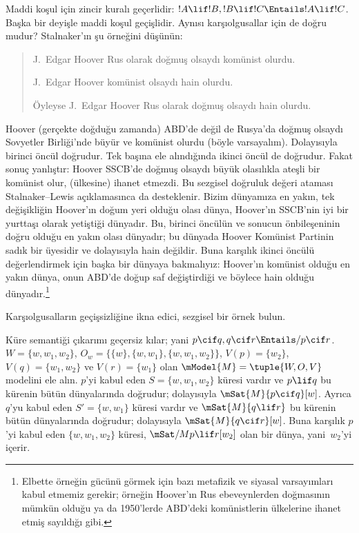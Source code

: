 \documentclass[../../../include/open-logic-section]{subfiles}
\begin{document}


Maddi koşul için zincir kuralı geçerlidir:
$!A\lif !B,!B\lif !C\Entails !A\lif !C$. Başka bir deyişle maddi koşul
geçişlidir. Aynısı karşıolgusallar için de doğru mudur? Stalnaker'ın şu
örneğini düşünün:
\begin{quote}
  J.~Edgar Hoover Rus olarak doğmuş olsaydı komünist olurdu.

  J.~Edgar Hoover komünist olsaydı hain olurdu.

  Öyleyse J.~Edgar Hoover Rus olarak doğmuş olsaydı hain olurdu.
\end{quote}
Hoover (gerçekte doğduğu zamanda) ABD'de değil de Rusya'da doğmuş olsaydı
Sovyetler Birliği'nde büyür ve komünist olurdu (böyle varsayalım). Dolayısıyla
birinci öncül doğrudur. Tek başına ele alındığında ikinci öncül de doğrudur.
Fakat sonuç yanlıştır: Hoover SSCB'de doğmuş olsaydı büyük olasılıkla ateşli
bir komünist olur, (ülkesine) ihanet etmezdi. Bu sezgisel doğruluk değeri
ataması Stalnaker--Lewis açıklamasınca da desteklenir. Bizim dünyamıza en
yakın, tek değişikliğin Hoover'ın doğum yeri olduğu olası dünya, Hoover'ın
SSCB'nin iyi bir yurttaşı olarak yetiştiği dünyadır. Bu, birinci öncülün ve
sonucun önbileşeninin doğru olduğu en yakın olası dünyadır; bu dünyada Hoover
Komünist Partinin sadık bir üyesidir ve dolayısıyla hain değildir. Buna
karşılık ikinci öncülü değerlendirmek için başka bir dünyaya bakmalıyız:
Hoover'ın komünist olduğu en yakın dünya, onun ABD'de doğup saf değiştirdiği
ve böylece hain olduğu dünyadır.\footnote{Elbette örneğin gücünü görmek için
  bazı metafizik ve siyasal varsayımları kabul etmemiz gerekir; örneğin
  Hoover'ın Rus ebeveynlerden doğmasının mümkün olduğu ya da 1950'lerde
  ABD'deki komünistlerin ülkelerine ihanet etmiş sayıldığı gibi.}

\begin{prob}
  Karşıolgusalların geçişsizliğine ikna edici, sezgisel bir örnek bulun.
\end{prob}

\begin{ex}
  Küre semantiği çıkarımı geçersiz kılar; yani
  $p\cif q,q\cif r\Entails/ p\cif r$. $W=\{w,w_1,w_2\}$,
  $O_w=\{\{w\},\{w,w_1\},\{w,w_1,w_2\}\}$,
  $V(p)=\{w_2\}$, $V(q)=\{w_1,w_2\}$ ve $V(r)=\{w_1\}$ olan
  $\mModel{M}=\tuple{W,O,V}$ modelini ele alın. $p$'yi kabul eden
  $S=\{w,w_1,w_2\}$ küresi vardır ve $p\lif q$ bu kürenin bütün
  dünyalarında doğrudur; dolayısıyla $\mSat{M}{p\cif q}[w]$. Ayrıca $q$'yu
  kabul eden $S'=\{w,w_1\}$ küresi vardır ve $\mSat{M}{q\lif r}$ bu
  kürenin bütün dünyalarında doğrudur; dolayısıyla $\mSat{M}{q\cif r}[w]$.
  Buna karşılık $p$'yi kabul eden $\{w,w_1,w_2\}$ küresi,
  $\mSat/{M}{p\lif r}[w_2]$ olan bir dünya, yani~$w_2$'yi içerir.
\end{ex}
\end{document}

